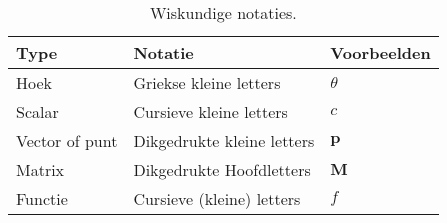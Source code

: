 \begin{table}
  \centering
  \begin{tabular}{@{}lll@{}}\toprule
    Type           & Notatie                    & Voorbeelden  \\ \midrule
    Hoek           & Griekse kleine letters     & $\theta$     \\
    Scalar         & Cursieve kleine letters    & $\mathit{c}$ \\
    Vector of punt & Dikgedrukte kleine letters & $\mathbf{p}$ \\
    Matrix         & Dikgedrukte Hoofdletters   & $\mathbf{M}$ \\
    Functie        & Cursieve (kleine) letters  & $\mathit{f}$ \\ \bottomrule
  \end{tabular}
  \caption{Wiskundige notaties.}
  \label{tbl:math-notaties}
\end{table}


